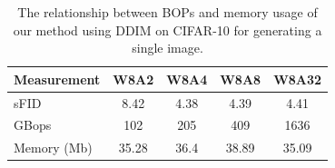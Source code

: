 \begin{table}[ht!]
\small
\centering
\vspace{-0.1in}
\caption{The relationship between BOPs and memory usage of our method using DDIM on CIFAR-10 for generating a single image.}
\begin{tabular}{l|ccc|c}
\toprule
{Measurement} & {W8A2} & {W8A4} & {W8A8} & {W8A32} \\
\midrule
sFID & 8.42 & 4.38  & 4.39 & 4.41 \\
GBops & 102 & 205 & 409 & 1636 \\
Memory (Mb) & 35.28 & 36.4 & 38.89 & 35.09 \\
\bottomrule
\end{tabular}
\vspace{-0.1in}
\label{tab:memory}
\end{table}

